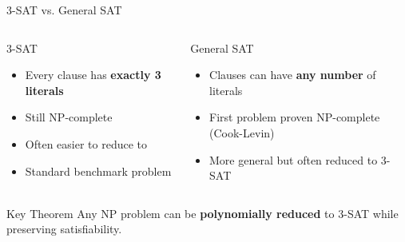 \documentclass{beamer}
\begin{document}
\begin{frame}{3-SAT vs. General SAT}
    \begin{columns}[T]
        \begin{column}{0.5\textwidth}
            \begin{block}{3-SAT}
                \begin{itemize}
                    \item Every clause has \textbf{exactly 3 literals}
                    \item Still NP-complete
                    \item Often easier to reduce to
                    \item Standard benchmark problem
                \end{itemize}
            \end{block}
        \end{column}
        
        \begin{column}{0.5\textwidth}
            \begin{block}{General SAT}
                \begin{itemize}
                    \item Clauses can have \textbf{any number} of literals
                    \item First problem proven NP-complete (Cook-Levin)
                    \item More general but often reduced to 3-SAT
                \end{itemize}
            \end{block}
        \end{column}
    \end{columns}
    
    \begin{alertblock}{Key Theorem}
        Any NP problem can be \textbf{polynomially reduced} to 3-SAT while preserving satisfiability.
    \end{alertblock}
\end{frame}
\end{document}
